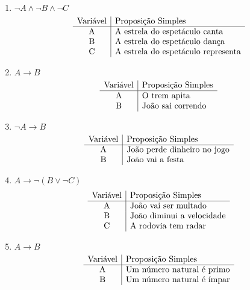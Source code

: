 \begin{enumerate}
\begin{enumerate}
				\item $ \neg A \land \neg B \land \neg C $
				\[\begin{array}{c|l} 
				\text{Vari\'avel} & \text{Proposi\c{c}\~ao Simples} \\ \hline
				$A$        & \text{A estrela do espet\'aculo canta}\\ 
				$B$        & \text{A estrela do espet\'aculo dan\c{c}a}\\
				$C$ 	   & \text{A estrela do espet\'aculo representa} \\
				\end{array}
				\]
				
				\item $ A \to B $
				\[\begin{array}{c|l} 
				\text{Vari\'avel} & \text{Proposi\c{c}\~ao Simples} \\ \hline
				$A$        & \text{O trem apita}\\ 
				$B$        & \text{Jo\~ao sai correndo}\\
				\end{array}
				\]
 
				\item $ \neg A \to B $
				\[\begin{array}{c|l} 
				\text{Vari\'avel} & \text{Proposi\c{c}\~ao Simples} \\ \hline
				$A$        & \text{Jo\~ao perde dinheiro no jogo}\\ 
				$B$        & \text{Jo\~ao vai a festa}\\
				\end{array}
				\] 
				
				\item $ A \to \neg (B \lor \neg C) $
				\[\begin{array}{c|l} 
				\text{Vari\'avel} & \text{Proposi\c{c}\~ao Simples} \\ \hline
				$A$        & \text{Jo\~ao vai ser multado}\\ 
				$B$        & \text{Jo\~ao diminui a velocidade}\\
				$C$        & \text{A rodovia tem radar}\\
				\end{array}
				\]
				
				\item $ A \to B $
				\[\begin{array}{c|l} 
				\text{Vari\'avel} & \text{Proposi\c{c}\~ao Simples} \\ \hline
				$A$        & \text{Um n\'umero natural \'e primo}\\ 
				$B$        & \text{Um n\'umero natural \'e \'impar}\\
				\end{array}
				\]		
						

\end{enumerate}
\end{enumerate}
